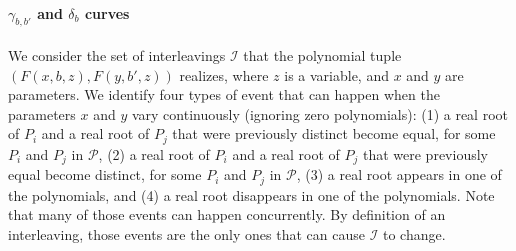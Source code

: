 \paragraph{$\gamma_{b,b'}$ and $\delta_{b}$ curves}
We consider the set of interleavings $\mathcal{I}$ that the
polynomial tuple
$(F(x,b,z),F(y,b',z))$
realizes, where $z$ is a variable, and $x$ and $y$ are parameters.
We identify four types of event that can happen when the parameters $x$ and $y$
vary continuously (ignoring zero polynomials):
(1) a real root of \(P_i\) and a real root of \(P_j\) that were previously
distinct become equal, for some \(P_i\) and \(P_j\) in \(\mathcal{P}\),
(2) a real root of \(P_i\) and a real root of \(P_j\) that were previously
equal become distinct, for some \(P_i\) and \(P_j\) in \(\mathcal{P}\),
(3) a real root appears in one of the polynomials,
and (4) a real root disappears in one of the polynomials.
Note that many of those events can happen concurrently.
By definition of an interleaving, those events are the only ones that can cause
$\mathcal{I}$ to change.

